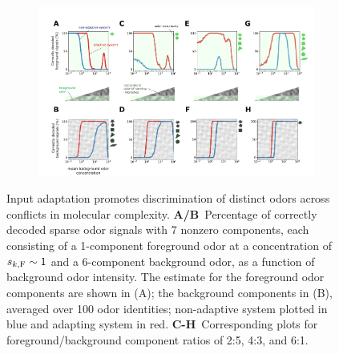 \begin{figure}
	\begin{subfigure}[t]{\linewidth}
		\includegraphics[width=\textwidth]{figures/Figures_signal_discrimination_weber_law}
		\label{fig:signal_discrimination_a}
	\end{subfigure}
	\begin{subfigure}[t]{0\linewidth}
		\label{fig:signal_discrimination_b}
	\end{subfigure}
	\begin{subfigure}[t]{0\linewidth}
 		\label{fig:signal_discrimination_c}
	\end{subfigure}
	\begin{subfigure}[t]{0\linewidth}
		\label{fig:signal_discrimination_d}
	\end{subfigure}
	\begin{subfigure}[t]{0\linewidth}
		\label{fig:signal_discrimination_e}
	\end{subfigure}
	\begin{subfigure}[t]{0\linewidth}
		\label{fig:signal_discrimination_f}
	\end{subfigure}
	\begin{subfigure}[t]{0\linewidth}
		\label{fig:signal_discrimination_g}
	\end{subfigure}
	\begin{subfigure}[t]{0\linewidth}
		\label{fig:signal_discrimination_h}
	\end{subfigure}
	\caption{\footnotesize{Input adaptation promotes discrimination of distinct odors across conflicts in molecular complexity. \textbf{A/B}~Percentage of correctly decoded sparse odor signals with 7 nonzero components, each consisting of a 1-component foreground odor at a concentration of $s_{k, \text F} \sim 1$ and a 6-component background odor, as a function of background odor intensity. The estimate for the foreground odor components are shown in (A); the background components in (B), averaged over 100 odor identities; non-adaptive system plotted in blue and adapting system in red. \textbf{C-H}~Corresponding plots for foreground/background component ratios of 2:5, 4:3, and 6:1.}}
	\label{fig:signal_discrimination}
\end{figure}

